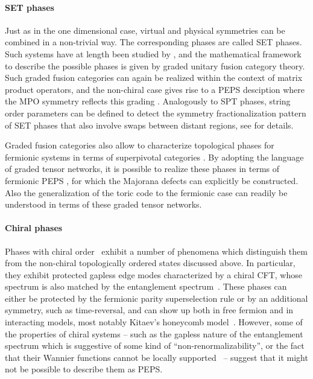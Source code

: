 \documentclass[rmp,aps,reprint,superscriptaddress,nobalancelastpage]{revtex4-1}
\begin{document}
    \paragraph{SET phases}
    Just as in the one dimensional case, virtual and physical symmetries can be combined in a non-trivial way. The corresponding phases are called SET phases. Such systems have at length been studied by \cite{barkeshli:SET}, and the mathematical framework to describe the possible phases is given by graded unitary fusion category theory. Such graded fusion categories can again be realized within the context of matrix product operators, and the non-chiral case gives rise to a PEPS desciption where the MPO symmetry reflects this grading \cite{williamson:SET}. Analogously to SPT phases, string order parameters can be defined to detect the symmetry fractionalization pattern of SET phases that also involve swaps between distant regions, see \citet{Garre_Rubio_2019} for details.


    Graded fusion categories also allow to characterize topological phases for fermionic systems in terms of superpivotal categories \cite{aasen2019fermion}. By adopting the language of graded tensor networks, it is possible to realize these phases in terms of fermionic PEPS \cite{bultinck:fermionicPEPS}, for which the Majorana defects can explicitly be constructed. Also the generalization of the toric code to the fermionic case \cite{gu2014lattice}  can readily be understood in terms of these graded tensor networks.

    \paragraph{Chiral phases}

    Phases with chiral order~\cite{bernevig:book-topo-ins} exhibit a number of phenomena which distinguish them from the non-chiral topologically ordered states discussed above. In particular, they exhibit protected gapless edge modes characterized by a chiral CFT, whose spectrum is also matched by the entanglement spectrum~\cite{li:es-qhe-sphere}. These phases can either be protected by the fermionic parity superselection rule or by an additional symmetry, such as time-reversal, and can show up both in free fermion and in interacting models, most notably Kitaev's honeycomb model~\cite{kitaev:honeycomb-model}.
    However, some of the properties of chiral systems -- such as the gapless nature of the entanglement spectrum which is suggestive of some kind of ``non-renormalizability'', or the fact that their Wannier functions cannot be locally supported~\cite{kohn:wannier-functions} -- suggest that it might not be possible to describe them as PEPS.
\end{document}
